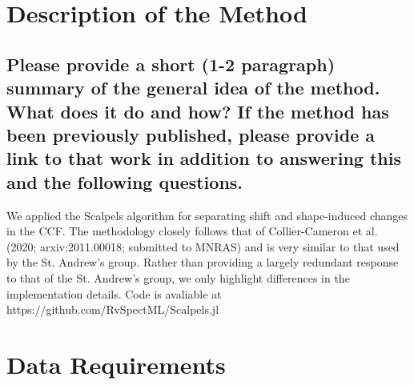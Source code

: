 \documentclass[12pt]{article}
\begin{document}
\section{Description of the Method}
\subsection{Please provide a short (1-2 paragraph) summary of the general idea of the method.  What does it do and how?  If the method has been previously published, please provide a link to that work in addition to answering this and the following questions.}

We applied the Scalpels algorithm for separating shift and shape-induced changes in the CCF.
The methodology closely follows that of Collier-Cameron et al. (2020; arxiv:2011.00018; submitted to MNRAS) and is very similar to that used by the St. Andrew's group.
Rather than providing a largely redundant response to that of the St. Andrew's group, we only highlight differences in the implementation details.
Code is avaliable at https://github.com/RvSpectML/Scalpels.jl







\section{Data Requirements}
\end{document}
